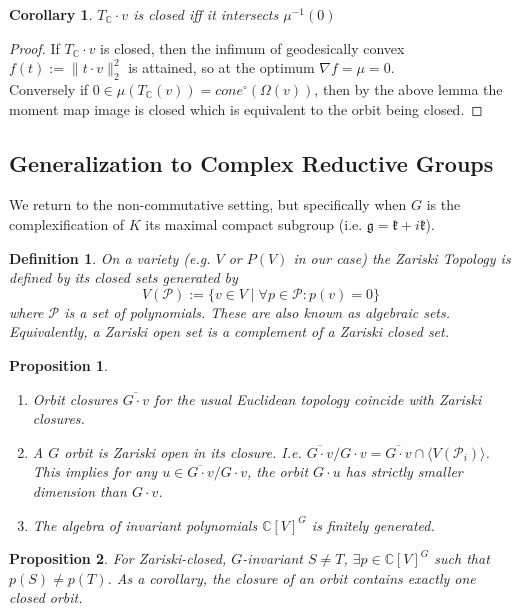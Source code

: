 \documentclass{article}
\newtheorem{corollary}{Corollary}
\newtheorem{prop}{Proposition}
\newtheorem{definition}{Definition}
\newcommand{\C}{{\mathbb{C}}}
\begin{document}
\begin{corollary}
$T_{\C} \cdot v$ is closed iff it intersects $\mu^{-1}(0)$
\end{corollary}
\begin{proof}
If $T_{\C} \cdot v$ is closed, then the infimum of geodesically convex $f(t) := \|t \cdot v\|_{2}^{2}$ is attained, so at the optimum $\nabla f = \mu = 0$. 
\\ Conversely if $0 \in \mu(T_{\C}(v)) = cone^{\circ}(\Omega(v))$, then by the above lemma the moment map image is closed which is equivalent to the orbit being closed. 
\end{proof}


\subsection{Generalization to Complex Reductive Groups}
We return to the non-commutative setting, but specifically when $G$ is the complexification of $K$ its maximal compact subgroup (i.e. $\mathfrak{g} = \mathfrak{k} + i \mathfrak{k}$). 

\begin{definition}
On a variety (e.g. $V$ or $P(V)$ in our case) the Zariski Topology is defined by its closed sets generated by
\[ V(\mathcal{P}) := \{v \in V \mid \forall p \in \mathcal{P}: p(v) = 0\}  \]
where $\mathcal{P}$ is a set of polynomials. These are also known as algebraic sets. Equivalently, a Zariski open set is a complement of a Zariski closed set. 
\end{definition}

\begin{prop}
\begin{enumerate}
    \item Orbit closures $\overline{G \cdot v}$ for the usual Euclidean topology coincide with Zariski closures. 
    \item A $G$ orbit is Zariski open in its closure. I.e. $\overline{G \cdot v}/ G \cdot v = \overline{G \cdot v} \cap \langle V(\mathcal{P}_{i}) \rangle$. This implies for any $u \in \overline{G \cdot v}/ G \cdot v$, the orbit $G \cdot u$ has strictly smaller dimension than $G \cdot v$.  
    \item The algebra of invariant polynomials $\C[V]^{G}$ is finitely generated. 
\end{enumerate}
\end{prop}

\begin{prop}
For Zariski-closed, $G$-invariant $S \neq T$, $\exists p \in \C[V]^{G}$ such that $p(S) \neq p(T)$. As a corollary, the closure of an orbit contains exactly one closed orbit. 
\end{prop}
\end{document}
